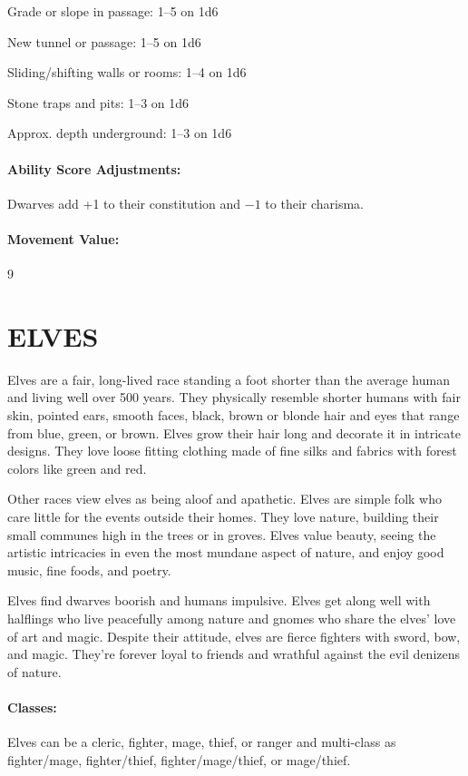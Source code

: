 \begin{multicols}{2}
Grade or slope in passage: 1--5 on 1d6

New tunnel or passage: 1--5 on 1d6

Sliding/shifting walls or rooms: 1--4 on 1d6

Stone traps and pits: 1--3 on 1d6

Approx. depth underground: 1--3 on 1d6

\paragraph{Ability Score Adjustments:} Dwarves add +1 to their constitution and $-1$ to their charisma.  

\paragraph{Movement Value:} 9

\section{ELVES}

Elves are a fair, long-lived race standing a foot shorter than the average human and living well over 500 years.  They physically resemble shorter humans with fair skin, pointed ears, smooth faces, black, brown or blonde hair and eyes that range from blue, green, or brown.  Elves grow their hair long and decorate it in intricate designs.  They love loose fitting clothing made of fine silks and fabrics with forest colors like green and red.

Other races view elves as being aloof and apathetic.  Elves are simple folk who care little for the events outside their homes.  They love nature, building their small communes high in the trees or in groves.  Elves value beauty, seeing the artistic intricacies in even the most mundane aspect of nature, and enjoy good music, fine foods, and poetry.

Elves find dwarves boorish and humans impulsive.  Elves get along well with halflings who live peacefully among nature and gnomes who share the elves' love of art and magic.  Despite their attitude, elves are fierce fighters with sword, bow, and magic.  They're forever loyal to friends and wrathful against the evil denizens of nature.  

\paragraph{Classes:} Elves can be a cleric, fighter, mage, thief, or ranger and multi-class as fighter/mage, fighter/thief, fighter/mage/thief, or mage/thief.


\end{multicols}
